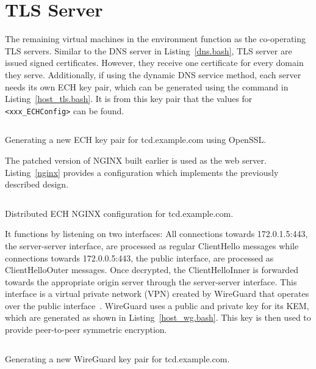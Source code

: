 \section{TLS Server}

The remaining virtual machines in the environment function as the co-operating TLS servers. Similar to the DNS server in Listing~\ref{dns.bash}, TLS server are issued signed certificates. However, they receive one certificate for every domain they serve. Additionally, if using the dynamic DNS service method, each server needs its own ECH key pair, which can be generated using the command in Listing~\ref{host_tls.bash}. It is from this key pair that the values for \verb|<xxx_ECHConfig>| can be found.

\begin{listing}[ht]
\inputminted{bash}{snippets/host_tls.bash}
\caption[Generating a new ECH key pair for tcd.example.com using OpenSSL]{Generating a new ECH key pair for tcd.example.com using OpenSSL.}
\label{host_tls.bash}
\end{listing}

The patched version of NGINX built earlier is used as the web server. Listing~\ref{nginx} provides a configuration which implements the previously described design.

\begin{listing}[ht]
\inputminted{nginx}{snippets/nginx}
\caption[Distributed ECH NGINX configuration for tcd.example.com]{Distributed ECH NGINX configuration for tcd.example.com.}
\label{nginx}
\end{listing}

It functions by listening on two interfaces: All connections towards 172.0.1.5:443, the server-server interface, are processed as regular ClientHello messages while connections towards 172.0.0.5:443, the public interface, are processed as ClientHelloOuter messages. Once decrypted, the ClientHelloInner is forwarded towards the appropriate origin server through the server-server interface. This interface is a virtual private network (VPN) created by WireGuard that operates over the public interface~\cite{donenfeld2017wireguard}. WireGuard uses a public and private key for its KEM, which are generated as shown in Listing~\ref{host_wg.bash}. This key is then used to provide peer-to-peer symmetric encryption.

\begin{listing}[ht]
\inputminted{bash}{snippets/host_wg.bash}
\caption[Generating a new WireGuard key pair for tcd.example.com]{Generating a new WireGuard key pair for tcd.example.com.}
\label{host_wg.bash}
\end{listing}

